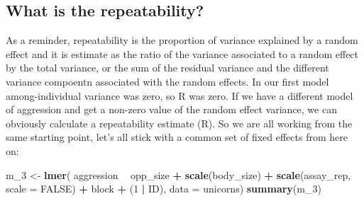 \documentclass[
  12pt,
]{book}
\newenvironment{Shaded}{\begin{snugshade}}{\end{snugshade}}
\newcommand{\DataTypeTok}[1]{\textcolor[rgb]{0.13,0.29,0.53}{#1}}
\newcommand{\DecValTok}[1]{\textcolor[rgb]{0.00,0.00,0.81}{#1}}
\newcommand{\KeywordTok}[1]{\textcolor[rgb]{0.13,0.29,0.53}{\textbf{#1}}}
\newcommand{\NormalTok}[1]{#1}
\newcommand{\OperatorTok}[1]{\textcolor[rgb]{0.81,0.36,0.00}{\textbf{#1}}}
\newcommand{\OtherTok}[1]{\textcolor[rgb]{0.56,0.35,0.01}{#1}}
\newcommand{\StringTok}[1]{\textcolor[rgb]{0.31,0.60,0.02}{#1}}
\begin{document}
\hypertarget{what-is-the-repeatability}{%
\subsection{What is the repeatability?}\label{what-is-the-repeatability}}

As a reminder, repeatability is the proportion of variance explained by a random effect and it is estimate as the ratio of the variance associated to a random effect by the total variance, or the sum of the residual variance and the different variance compoentn associated with the random effects.
In our first model among-individual variance was zero, so R was zero. If we have a different model of aggression and get a non-zero value of the random effect variance, we can obviously calculate a repeatability estimate (R). So we are all working from the same starting point, let's all stick with a common set of fixed effects from here on:

\begin{Shaded}
\begin{Highlighting}[]
\NormalTok{m_}\DecValTok{3}\NormalTok{ <-}\StringTok{ }\KeywordTok{lmer}\NormalTok{(}
\NormalTok{  aggression }\OperatorTok{~}\StringTok{ }\NormalTok{opp_size }\OperatorTok{+}\StringTok{ }\KeywordTok{scale}\NormalTok{(body_size)}
              \OperatorTok{+}\StringTok{ }\KeywordTok{scale}\NormalTok{(assay_rep, }\DataTypeTok{scale =} \OtherTok{FALSE}\NormalTok{) }\OperatorTok{+}\StringTok{ }\NormalTok{block}
              \OperatorTok{+}\StringTok{ }\NormalTok{(}\DecValTok{1} \OperatorTok{|}\StringTok{ }\NormalTok{ID),}
  \DataTypeTok{data =}\NormalTok{ unicorns)}
\KeywordTok{summary}\NormalTok{(m_}\DecValTok{3}\NormalTok{)}
\end{Highlighting}
\end{Shaded}
\end{document}
